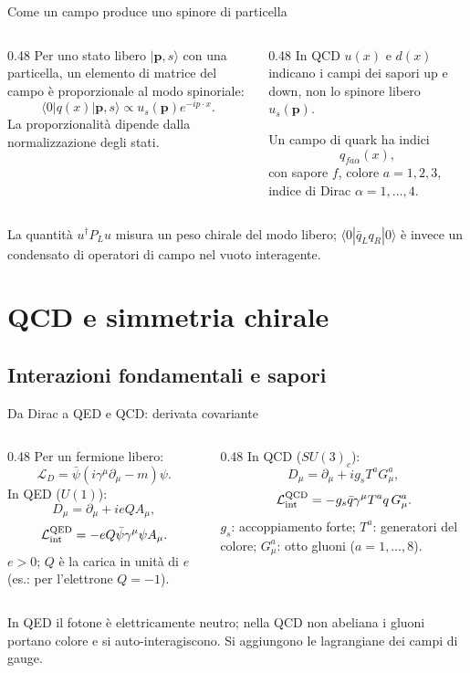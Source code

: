 \begin{frame}{Come un campo produce uno spinore di particella}
\small
\begin{columns}[T,onlytextwidth]
\begin{column}{0.48\textwidth}
Per uno stato libero $|\mathbf p,s\rangle$ con una particella, un elemento di matrice del campo è proporzionale al modo spinoriale:
\[
 \langle0|q(x)|\mathbf p,s\rangle
 \propto u_s(\mathbf p)e^{-ip\cdot x}.
\]
La proporzionalità dipende dalla normalizzazione degli stati.
\end{column}
\begin{column}{0.48\textwidth}
In QCD $u(x)$ e $d(x)$ indicano i campi dei sapori up e down, non lo spinore libero $u_s(\mathbf p)$.

Un campo di quark ha indici
\[
 q_{f a\alpha}(x),
\]
con sapore $f$, colore $a=1,2,3$, indice di Dirac $\alpha=1,\ldots,4$.
\end{column}
\end{columns}
\medskip
La quantità $u^\dagger P_Lu$ misura un peso chirale del modo libero; $\langle0|\bar q_Lq_R|0\rangle$ è invece un condensato di operatori di campo nel vuoto interagente.
\end{frame}

\section{QCD e simmetria chirale}

\subsection{Interazioni fondamentali e sapori}

\begin{frame}{Da Dirac a QED e QCD: derivata covariante}
\small
\begin{columns}[T,onlytextwidth]
\begin{column}{0.48\textwidth}
Per un fermione libero:
\[
 \mathcal L_D=\bar\psi(i\gamma^\mu\partial_\mu-m)\psi.
\]
In QED ($U(1)$):
\[
 D_\mu=\partial_\mu+ieQA_\mu,
\]
\[
 \mathcal L_{\rm int}^{\rm QED}
 =-eQ\bar\psi\gamma^\mu\psi A_\mu.
\]
$e>0$; $Q$ è la carica in unità di $e$ (es.: per l'elettrone $Q=-1$).
\end{column}
\begin{column}{0.48\textwidth}
In QCD ($SU(3)_c$):
\[
 D_\mu=\partial_\mu+ig_sT^aG_\mu^a,
\]
\[
 \mathcal L_{\rm int}^{\rm QCD}
 =-g_s\bar q\gamma^\mu T^a q\,G_\mu^a.
\]
$g_s$: accoppiamento forte; $T^a$: generatori del colore; $G_\mu^a$: otto gluoni ($a=1,\ldots,8$).
\end{column}
\end{columns}
\medskip
In QED il fotone è elettricamente neutro; nella QCD non abeliana i gluoni portano colore e si auto-interagiscono. Si aggiungono le lagrangiane dei campi di gauge.
\end{frame}

